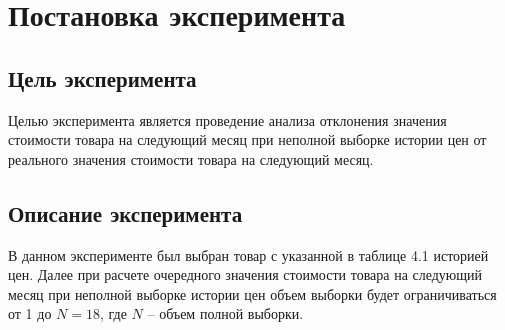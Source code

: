 \documentclass{bmstu}
\begin{document}
\section{Постановка эксперимента}

\subsection{Цель эксперимента}

Целью эксперимента является проведение анализа отклонения значения стоимости товара на следующий месяц при неполной выборке истории цен от реального значения стоимости товара на следующий месяц.

\subsection{Описание эксперимента}

В данном эксперименте был выбран товар с указанной в таблице 4.1 историей цен. Далее при расчете очередного значения стоимости товара на следующий месяц при неполной выборке истории цен объем выборки будет ограничиваться от 1 до $N = 18$, где $N$ -- объем полной выборки.
\end{document}
